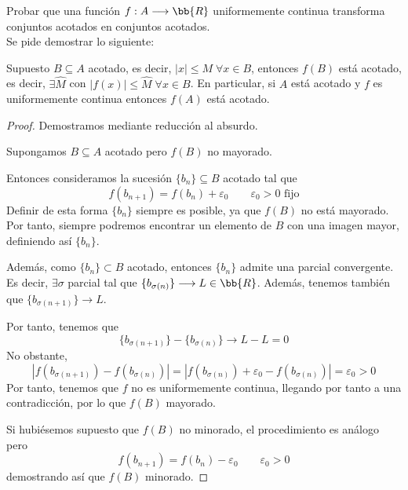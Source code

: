 \begin{ejercicio}
    Probar que una función $f:A\longrightarrow \bb{R}$ uniformemente continua transforma conjuntos acotados en conjuntos acotados.\\

    Se pide demostrar lo siguiente:
    
    Supuesto $B \subseteq A$ acotado, es decir, $|x|\leq M \; \forall x\in B$, entonces $f(B)$ está acotado, es decir, $\exists \hat{M}$ con $|f(x)| \leq \hat{M} \; \forall x\in B$. En particular, si $A$ está acotado y $f$ es uniformemente continua entonces $f(A)$ está acotado.

    \begin{proof} Demostramos mediante reducción al absurdo.
    
    Supongamos $B \subseteq A$ acotado pero $f(B)$ no mayorado.
    
    Entonces consideramos la sucesión $\{b_n\}\subseteq B$ acotado tal que
    \begin{equation*}
        f(b_{n+1}) = f(b_n) + \varepsilon_0\qquad \varepsilon_0>0 \text{ fijo}
    \end{equation*}
    Definir de esta forma $\{b_n\}$ siempre es posible, ya que $f(B)$ no está mayorado. Por tanto, siempre podremos encontrar un elemento de $B$ con una imagen mayor, definiendo así $\{b_n\}$.
    
    Además, como $\{b_n\}\subset B$ acotado, entonces $\{b_n\}$ admite una parcial convergente. Es decir, $\exists \sigma$ parcial tal que $\{b_{\sigma(n)}\} \longrightarrow L \in \bb{R}$. Además, tenemos también que $\{b_{\sigma(n+1)}\} \longrightarrow L$.

    Por tanto, tenemos que
    \begin{equation*}
        \{b_{\sigma(n+1)}\} - \{b_{\sigma(n)}\} \longrightarrow L-L=0
    \end{equation*}
    No obstante,
    \begin{equation*}
        |f(b_{\sigma(n+1)}) - f(b_{\sigma(n)})|
         = |f(b_{\sigma(n)}) + \varepsilon_0 - f(b_{\sigma(n)})| = \varepsilon_0>0
    \end{equation*}
    Por tanto, tenemos que $f$ no es uniformemente continua, llegando por tanto a una contradicción, por lo que $f(B)$ mayorado.

    Si hubiésemos supuesto que $f(B)$ no minorado, el procedimiento es análogo pero 
    \begin{equation*}
        f(b_{n+1}) = f(b_n) - \varepsilon_0\qquad \varepsilon_0>0
    \end{equation*}
    demostrando así que $f(B)$ minorado.
\end{proof}


\end{ejercicio}
